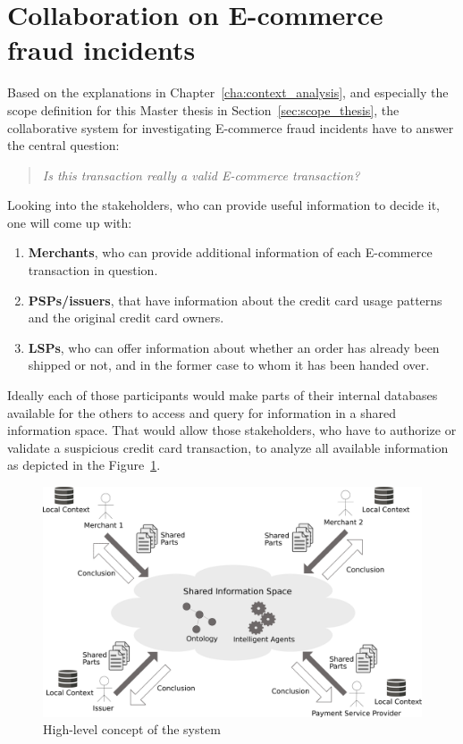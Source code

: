 
\section{Collaboration on \gls{E-commerce} fraud incidents}
\label{sec:concept_overview}

Based on the explanations in Chapter~\ref{cha:context_analysis}, and especially the scope definition for this Master thesis in Section~\ref{sec:scope_thesis}, the collaborative system for investigating \gls{E-commerce} fraud incidents have to answer the central question:\@

\begin{quotation}
  \textit{Is this transaction really a valid \gls{E-commerce} transaction?}
\end{quotation}

Looking into the stakeholders, who can provide useful information to decide it, one will come up with:\@

\begin{enumerate}
    \item \textbf{Merchants}, who can provide additional information of each \gls{E-commerce} transaction in question.
    \item \textbf{\gls{PSP}s/issuers}, that have information about the credit card usage patterns and the original credit card owners.
    \item \textbf{\gls{LSP}s}, who can offer information about whether an order has already been shipped or not, and in the former case to whom it has been handed over.
\end{enumerate}

Ideally each of those participants would make parts of their internal databases available for the others to access and query for information in a shared information space. That would allow those stakeholders, who have to authorize or validate a suspicious credit card transaction, to analyze all available information as depicted in the Figure~\ref{fig:images_system_overview}.\@

\begin{figure}[H]
	\centering
		\includegraphics[width=0.9\columnwidth]{images/system_overview.pdf}
	\caption{High-level concept of the system}
\label{fig:images_system_overview}
\end{figure}

